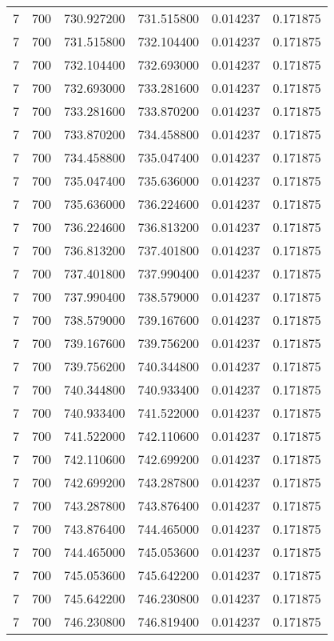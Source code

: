 \begin{longtable}{rrrrrr}
7 & 700 & 730.927200 & 731.515800 & 0.014237 & 0.171875 \\
7 & 700 & 731.515800 & 732.104400 & 0.014237 & 0.171875 \\
7 & 700 & 732.104400 & 732.693000 & 0.014237 & 0.171875 \\
7 & 700 & 732.693000 & 733.281600 & 0.014237 & 0.171875 \\
7 & 700 & 733.281600 & 733.870200 & 0.014237 & 0.171875 \\
7 & 700 & 733.870200 & 734.458800 & 0.014237 & 0.171875 \\
7 & 700 & 734.458800 & 735.047400 & 0.014237 & 0.171875 \\
7 & 700 & 735.047400 & 735.636000 & 0.014237 & 0.171875 \\
7 & 700 & 735.636000 & 736.224600 & 0.014237 & 0.171875 \\
7 & 700 & 736.224600 & 736.813200 & 0.014237 & 0.171875 \\
7 & 700 & 736.813200 & 737.401800 & 0.014237 & 0.171875 \\
7 & 700 & 737.401800 & 737.990400 & 0.014237 & 0.171875 \\
7 & 700 & 737.990400 & 738.579000 & 0.014237 & 0.171875 \\
7 & 700 & 738.579000 & 739.167600 & 0.014237 & 0.171875 \\
7 & 700 & 739.167600 & 739.756200 & 0.014237 & 0.171875 \\
7 & 700 & 739.756200 & 740.344800 & 0.014237 & 0.171875 \\
7 & 700 & 740.344800 & 740.933400 & 0.014237 & 0.171875 \\
7 & 700 & 740.933400 & 741.522000 & 0.014237 & 0.171875 \\
7 & 700 & 741.522000 & 742.110600 & 0.014237 & 0.171875 \\
7 & 700 & 742.110600 & 742.699200 & 0.014237 & 0.171875 \\
7 & 700 & 742.699200 & 743.287800 & 0.014237 & 0.171875 \\
7 & 700 & 743.287800 & 743.876400 & 0.014237 & 0.171875 \\
7 & 700 & 743.876400 & 744.465000 & 0.014237 & 0.171875 \\
7 & 700 & 744.465000 & 745.053600 & 0.014237 & 0.171875 \\
7 & 700 & 745.053600 & 745.642200 & 0.014237 & 0.171875 \\
7 & 700 & 745.642200 & 746.230800 & 0.014237 & 0.171875 \\
7 & 700 & 746.230800 & 746.819400 & 0.014237 & 0.171875 \\

\end{longtable}
